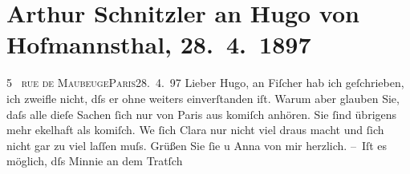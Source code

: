 

         
         \renewcommand{\erwaehntePersonen}{Personen: Anna Epstein, Samuel Fischer, Hugo von Hofmannsthal, Clara Katharina Pollaczek, Hermine von Schaffgotsch}
         \renewcommand{\erwaehnteOrte}{Orte: Paris, Versailles, Wien, rue de Maubeuge}
         \renewcommand{\erwaehnteWerke}{Werke: Der Weg ins Freie. Roman}
               \section[Arthur Schnitzler an Hugo von Hofmannsthal, 28. 4. 1897]{ Arthur Schnitzler an Hugo von Hofmannsthal, 28. 4. 1897}\nopagebreak{}\rehead{ }\begin{ledgroupsized}[t]{13cm}\normalsize\beginnumbering \toendnotes[C]{\smallbreak\pagebreak[2]} 
\toendnotes[C]{\smallbreak}\pstart
           {\pb}5  \textsc{rue de Maubeuge}\textsc{Paris}28. 4. 97\pend
           \pstart{}Lieber Hugo, \pend\pstart
           an Fiſcher hab ich geſchrieben, ich zweifle
                    nicht, dſs er ohne weiters einverſtanden iſt. Warum aber glauben Sie, daſs alle
                    dieſe Sachen ſich nur von Paris aus komiſch
                    anhören. Sie ſind übrigens mehr ekelhaft als komiſch. We{\geminationn}{ }{\pb}ſich Clara nur
                    nicht viel draus macht und ſich nicht gar zu viel \label{K_L00672_1v}\label{K_L00672_1h}
                    laſſen muſs. Grüßen Sie ſie u Anna von mir
                    herzlich.\pend
           \pstart
           – Iſt es möglich, dſs Minnie an dem Tratſch

\end{ledgroupsized}
